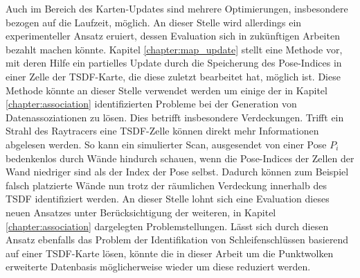 Auch im Bereich des Karten-Updates sind mehrere Optimierungen, insbesondere bezogen auf die Laufzeit, möglich. An dieser Stelle wird allerdings ein experimenteller Ansatz eruiert, dessen Evaluation sich in zukünftigen Arbeiten bezahlt machen könnte. Kapitel \ref{chapter:map_update} stellt eine Methode vor, mit deren Hilfe ein partielles Update durch die Speicherung des Pose-Indices in einer Zelle der TSDF-Karte, die diese zuletzt bearbeitet hat, möglich ist. Diese Methode könnte an dieser Stelle verwendet werden um einige der in Kapitel \ref{chapter:association} identifizierten Probleme bei der Generation von Datenassoziationen zu lösen. Dies betrifft insbesondere Verdeckungen. Trifft ein Strahl des Raytracers eine TSDF-Zelle können direkt mehr Informationen abgelesen werden. So kann ein simulierter Scan, ausgesendet von einer Pose $P_i$ bedenkenlos durch Wände hindurch schauen, wenn die Pose-Indices der Zellen der Wand niedriger sind als der Index der Pose selbst. Dadurch können zum Beispiel falsch platzierte Wände nun trotz der räumlichen Verdeckung innerhalb des TSDF identifiziert werden. An dieser Stelle lohnt sich eine Evaluation dieses neuen Ansatzes unter Berücksichtigung der weiteren, in Kapitel \ref{chapter:association} dargelegten Problemstellungen. Lässt sich durch diesen Ansatz ebenfalls das Problem der Identifikation von Schleifenschlüssen basierend auf einer TSDF-Karte lösen, könnte die in dieser Arbeit um die Punktwolken erweiterte Datenbasis möglicherweise wieder um diese reduziert werden.

